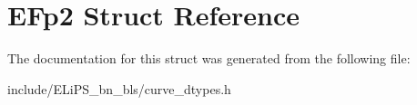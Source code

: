 \hypertarget{struct_e_fp2}{}\section{E\+Fp2 Struct Reference}
\label{struct_e_fp2}


The documentation for this struct was generated from the following file\+:\begin{DoxyCompactItemize}
\item 
include/\+E\+Li\+P\+S\+\_\+bn\+\_\+bls/curve\+\_\+dtypes.\+h\end{DoxyCompactItemize}

